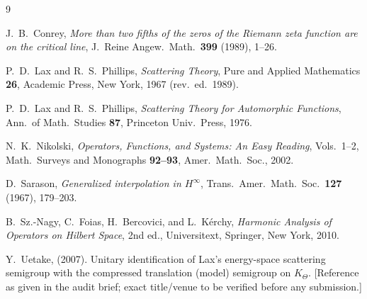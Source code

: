 \documentclass[11pt]{amsart}
\theoremstyle{plain}
\theoremstyle{definition}
\theoremstyle{remark}
\newcommand{\Kt}{K_{\Theta}}
\begin{document}
\begin{thebibliography}{9}

J.~B.~Conrey,
\emph{More than two fifths of the zeros of the Riemann zeta function are on the critical line},
J.~Reine Angew.\ Math.\ \textbf{399} (1989), 1--26.

P.~D.~Lax and R.~S.~Phillips,
\emph{Scattering Theory},
Pure and Applied Mathematics \textbf{26}, Academic Press, New York, 1967 (rev.\ ed.\ 1989).

P.~D.~Lax and R.~S.~Phillips,
\emph{Scattering Theory for Automorphic Functions},
Ann.\ of Math.\ Studies \textbf{87}, Princeton Univ.\ Press, 1976.

N.~K.~Nikolski,
\emph{Operators, Functions, and Systems: An Easy Reading}, Vols.\ 1--2,
Math.\ Surveys and Monographs \textbf{92--93}, Amer.\ Math.\ Soc., 2002.

D.~Sarason,
\emph{Generalized interpolation in $H^{\infty}$},
Trans.\ Amer.\ Math.\ Soc.\ \textbf{127} (1967), 179--203.

B.~Sz.-Nagy, C.~Foias, H.~Bercovici, and L.~K\'erchy,
\emph{Harmonic Analysis of Operators on Hilbert Space}, 2nd ed.,
Universitext, Springer, New York, 2010.

Y.~Uetake, (2007).
Unitary identification of Lax's energy-space scattering semigroup with the compressed
translation (model) semigroup on $\Kt$.
\textup{[Reference as given in the audit brief; exact title/venue to be verified before
any submission.]}

\end{thebibliography}
\end{document}
